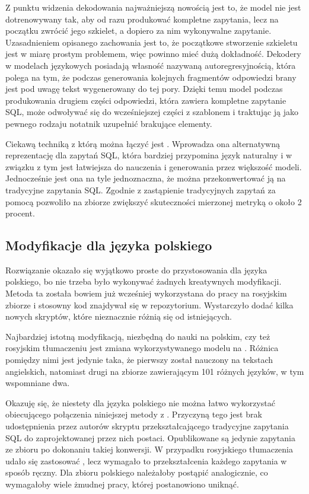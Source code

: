 Z punktu widzenia dekodowania najważniejszą nowością jest to, że model  nie jest dotrenowywany tak, aby od razu produkować kompletne zapytania, lecz na początku zwrócić jego szkielet, a dopiero za nim wykonywalne zapytanie. Uzasadnieniem opisanego zachowania jest to, że początkowe stworzenie szkieletu jest w miarę prostym problemem, więc powinno mieć dużą dokładność. Dekodery w modelach językowych posiadają własność nazywaną autoregresyjnością, która polega na tym, że podczas generowania kolejnych fragmentów odpowiedzi brany jest pod uwagę tekst wygenerowany do tej pory. Dzięki temu model  podczas produkowania drugiem części odpowiedzi, która zawiera kompletne zapytanie SQL, może odwoływać się do wcześniejszej części z szablonem i traktując ją jako pewnego rodzaju notatnik uzupełnić brakujące elementy.

Ciekawą techniką z którą  można łączyć jest  . Wprowadza ona alternatywną reprezentację dla zapytań SQL, która bardziej przypomina język naturalny i w związku z tym jest łatwiejsza do nauczenia i generowania przez większość modeli. Jednocześnie jest ona na tyle jednoznaczna, że można przekonwertować ją na tradycyjne zapytania SQL. Zgodnie z  zastąpienie tradycyjnych zapytań za pomocą  pozwoliło na zbiorze  zwiększyć skuteczności mierzonej metryką  o około 2 procent.

\subsection{Modyfikacje dla języka polskiego}
Rozwiązanie  okazało się wyjątkowo proste do przystosowania dla języka polskiego, bo nie trzeba było wykonywać żadnych kreatywnych modyfikacji. Metoda ta została bowiem już wcześniej wykorzystana do pracy na rosyjskim zbiorze  i stosowny kod znajdywał się w repozytorium. Wystarczyło dodać kilka nowych skryptów, które nieznacznie różnią się od istniejących.

Najbardziej istotną modyfikacją, niezbędną do nauki na polskim, czy też rosyjskim tłumaczeniu jest zmiana wykorzystywanego modelu  na  . Różnica pomiędzy nimi jest jedynie taka, że pierwszy został nauczony na tekstach angielskich, natomiast drugi na zbiorze zawierającym 101 różnych języków, w tym wspomniane dwa.

Okazuję się, że niestety dla języka polskiego nie można łatwo wykorzystać obiecującego połączenia niniejszej metody z . Przyczyną tego jest brak udostępnienia przez autorów  skryptu przekształcającego tradycyjne zapytania SQL do zaprojektowanej przez nich postaci. Opublikowane są jedynie zapytania ze zbioru  po dokonaniu takiej konwersji. W przypadku rosyjskiego tłumaczenia udało się zastosować , lecz wymagało to przekształcenia każdego zapytania w sposób ręczny. Dla zbioru polskiego należałoby postąpić analogicznie, co wymagałoby wiele żmudnej pracy, której postanowiono uniknąć.

